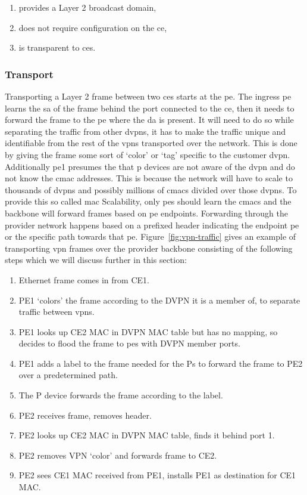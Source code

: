 \begin{enumerate}
	\item provides a Layer 2 broadcast domain,
	\item does not require configuration on the \ac{ce},
	\item is transparent to \acp{ce}.
\end{enumerate}


\subsubsection{Transport} %
\label{ssub:transport}

Transporting a Layer 2 frame between two \acp{ce} starts at the \ac{pe}. The ingress \ac{pe} learns the \ac{sa} of the frame behind the port connected to the \ac{ce}, then it needs to forward the frame to the \ac{pe} where the \ac{da} is present. It will need to do so while separating the traffic from other \acp{dvpn}, it has to make the traffic unique and identifiable from the rest of the \acp{vpn} transported over the network. This is done by giving the frame some sort of `color' or `tag' specific to the customer \ac{dvpn}. Additionally \ac{pe}1 presumes the that \ac{p} devices are not aware of the \ac{dvpn} and do not know the \ac{cmac} addresses. This is because the network will have to scale to thousands of \acp{dvpn} and possibly millions of \acp{cmac} divided over those \acp{dvpn}. To provide this so called \acs{mac} Scalability, only \acp{pe} should learn the \acp{cmac} and the backbone will forward frames based on \ac{pe} endpoints. Forwarding through the provider network happens based on a prefixed header indicating the endpoint \ac{pe} or the specific path towards that \ac{pe}. Figure~\ref{fig:vpn-traffic} gives an example of transporting \ac{vpn} frames over the provider backbone consisting of the following steps which we will discuss further in this section:

\begin{enumerate}
	\item Ethernet frame comes in from CE1.
	\item PE1 `colors' the frame according to the DVPN it is a member of, to separate traffic between \acp{vpn}.
	\item PE1 looks up CE2 MAC in DVPN MAC table but has no mapping, so decides to flood the frame to \acp{pe} with DVPN member ports.
	\item PE1 adds a label to the frame needed for the Ps to forward the frame to PE2 over a predetermined path.
	\item The P device forwards the frame according to the label.
	\item PE2 receives frame, removes header.
	\item PE2 looks up CE2 MAC in DVPN MAC table, finds it behind port 1.
	\item PE2 removes VPN `color' and forwards frame to CE2.
	\item PE2 sees CE1 MAC received from PE1, installs PE1 as destination for CE1 MAC.
\end{enumerate}

